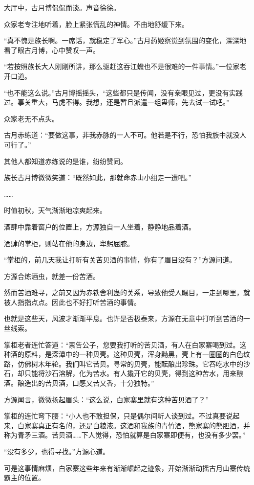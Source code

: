 \begin{this_body}
大厅中，古月博侃侃而谈。声音徐徐。

众家老专注地听着，脸上紧张慌乱的神情。不由地舒缓下来。

“真不愧是族长啊。一席话，就稳定了军心。”古月药姬察觉到氛围的变化，深深地看了眼古月博，心中赞叹一声。

“若按照族长大人刚刚所讲，那么驱赶这吞江蟾也不是很难的一件事情。”一位家老开口道。

“也不能这么说。”古月博摇摇头，“这些都只是传闻，没有亲眼见过，更没有实践过。事关重大，马虎不得。我想，还是暂且派遣一组蛊师，先去试一试吧。”

众家老无不点头。

古月赤练道：“要做这事，非我赤脉的一人不可。他若是不行，恐怕我族中就没人可行了。”

其他人都知道赤练说的是谁，纷纷赞同。

族长古月博微微笑道：“既然如此，那就命赤山小组走一遭吧。”

……

时值初秋，天气渐渐地凉爽起来。

酒肆中靠着窗户的位置上，方源独自一人坐着，静静地品着酒。

酒肆的掌柜，则站在他的身边，卑躬屈膝。

“掌柜的，前几天我让打听有关苦贝酒的事情，你有了眉目没有？”方源问道。

方源合炼酒虫，就差一份苦酒。

然而苦酒难寻，之前又因为赤铁舍利蛊的关系，导致他受人瞩目，一走到哪里，就被人指指点点。因此也不好打听苦酒的事情。

也就是这些天，风波才渐渐平息。也许是否极泰来，方源在无意中打听到苦酒的一丝线索。

掌柜老者连忙答道：“禀告公子，您要我打听的苦贝酒，有人在白家寨喝到过。这种酒的原料，是深潭中的一种贝壳。这种贝壳，浑身黝黑，壳上有一圈圈的白色纹路，仿佛树木年轮。我们叫它苦贝。寻常的贝壳，能酝酿出珍珠。它吞吃水中的沙石，却只能将沙石溶解，化为苦水。有人撬开它的贝壳，得到这种苦水，用来酿酒。酿造出的苦贝酒，口感又苦又香，十分独特。”

方源闻言，微微扬起眉头：“这么说，白家寨里就有这种苦贝酒了？”

掌柜的连忙弯下腰：“小人也不敢担保，只是偶尔间听人谈到过。不过真要说起来，白家寨真正有名的，还是白粮液。这酒和我族的青竹酒，熊家寨的熊胆酒，并称为青矛三酒。苦贝酒……下人觉得，恐怕就算是白家寨即便有，也没有多少罢。”

“没有多少，也得寻找。”方源心道。

可是这事情麻烦，白家寨这些年来有渐渐崛起之迹象，开始渐渐动摇古月山寨传统霸主的位置。


\end{this_body}
